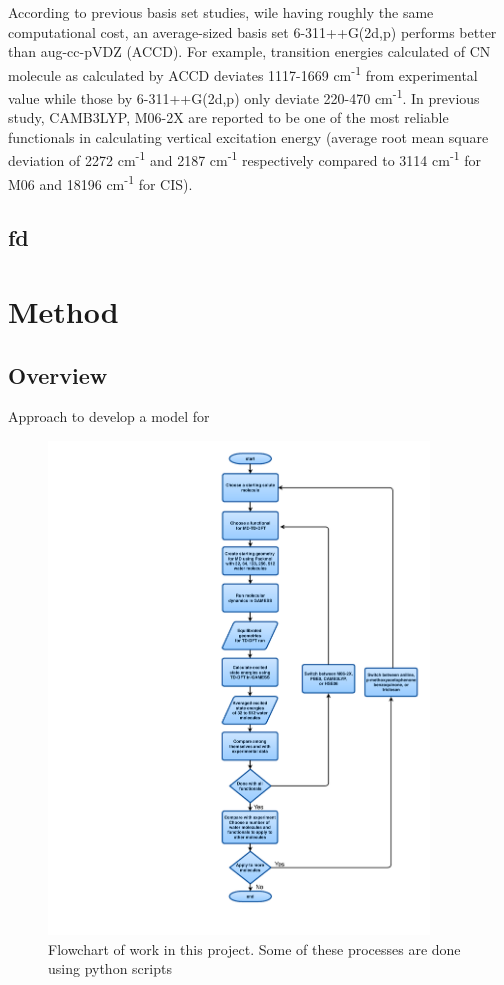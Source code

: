 \documentclass[
journal=jpcbfk, %
manuscript=article]{achemso}
\begin{document}
According to previous basis set studies, wile having roughly the same computational cost, an average-sized basis set 6-311++G(2d,p) performs better than aug-cc-pVDZ (ACCD).\cite{Wiberg2004,Barnes2014} For example, transition energies calculated of CN molecule as calculated by ACCD deviates 1117-1669 cm\textsuperscript{-1} from experimental value while those by 6-311++G(2d,p) only deviate 220-470 cm\textsuperscript{-1}. In previous study, CAMB3LYP, M06-2X are reported to be one of the most reliable functionals in calculating vertical excitation energy (average root mean square deviation of 2272 cm\textsuperscript{-1}  and 2187 cm\textsuperscript{-1}  respectively compared to 3114 cm\textsuperscript{-1} for M06 and 18196 cm\textsuperscript{-1} for CIS).\cite{Barnes2014} 

\subsection{fd}

\section{Method}

\subsection{Overview}
Approach to develop a model for 
\begin{figure}[!htb]
	\centering		
	\includegraphics[width=0.9\textwidth]{flowchart.pdf}
	\caption{Flowchart of work in this project. Some of these processes are done using python scripts}
	\label{fig:flowchart}
\end{figure}
\end{document}
